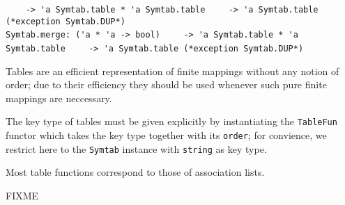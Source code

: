 \begin{isabellebody}
\begin{isamarkuptext}
\begin{mldecls}
\verb|    -> 'a Symtab.table * 'a Symtab.table|\isasep\isanewline%
\verb|    -> 'a Symtab.table (*exception Symtab.DUP*)| \\
  \verb|Symtab.merge: ('a * 'a -> bool)|\isasep\isanewline%
\verb|    -> 'a Symtab.table * 'a Symtab.table|\isasep\isanewline%
\verb|    -> 'a Symtab.table (*exception Symtab.DUP*)|
  \end{mldecls}%
\end{isamarkuptext}%
\isamarkuptrue%
%
\begin{isamarkuptext}%
Tables are an efficient representation of finite mappings without
  any notion of order;  due to their efficiency they should be used
  whenever such pure finite mappings are neccessary.

  The key type of tables must be given explicitly by instantiating
  the \verb|TableFun| functor which takes the key type
  together with its \verb|order|; for convience, we restrict
  here to the \verb|Symtab| instance with \verb|string|
  as key type.

  Most table functions correspond to those of association lists.%
\end{isamarkuptext}%
\isamarkuptrue%
%
\isamarkuptrue%
%
\isamarkuptrue%
%
\begin{isamarkuptext}%
FIXME%
\end{isamarkuptext}%
\isamarkuptrue%
%
\isadelimtheory
%
\endisadelimtheory
%
\isatagtheory
{}\isamarkupfalse%
%
\endisatagtheory
{\isafoldtheory}%
%
\isadelimtheory
%
\endisadelimtheory
\isanewline
\end{isabellebody}%
